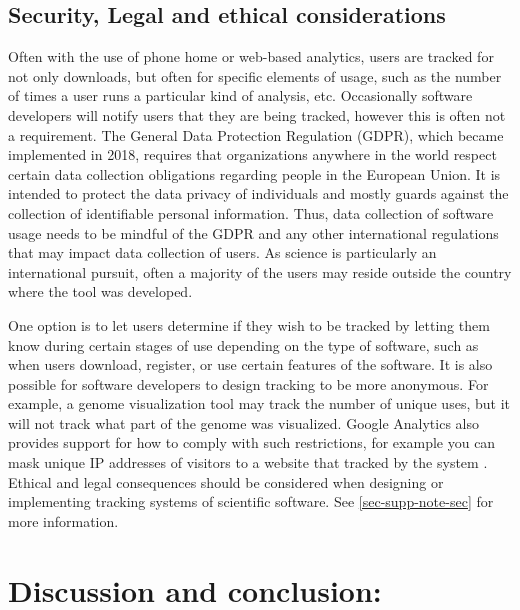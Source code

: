 \documentclass{article}
\begin{document}
\subsection{Security, Legal and ethical considerations}\label{sec:legal_ethics}
Often with the use of phone home or web-based analytics, users are tracked for not only downloads, but often for specific elements of usage, such as the number of times a user runs a particular kind of analysis, etc. Occasionally software developers will notify users that they are being tracked, however this is often not a requirement. The General Data Protection Regulation (GDPR), which became implemented in 2018, requires that organizations anywhere in the world respect certain data collection obligations regarding people in the European Union. It is intended to protect the data privacy of individuals and mostly guards against the collection of identifiable personal information. Thus, data collection of software usage needs to be mindful of the GDPR and any other international regulations that may impact data collection of users.  As science is particularly an international pursuit, often a majority of the users may reside outside the country where the tool was developed.

One option is to let users determine if they wish to be tracked by letting them know during certain stages of use depending on the type of software, such as when users download, register, or use certain features of the software. It is also possible for software developers to design tracking to be more anonymous. For example, a genome visualization tool may track the number of unique uses, but it will not track what part of the genome was visualized. Google Analytics also provides support for how to comply with such restrictions, for example you can  mask unique IP addresses of visitors to a website that tracked by the system \cite{google_analytics_privacy}.  Ethical and legal consequences should be considered when designing or implementing tracking systems of scientific software. See \ref{sec-supp-note-sec} for more information.



\section{Discussion and conclusion:}
\end{document}
